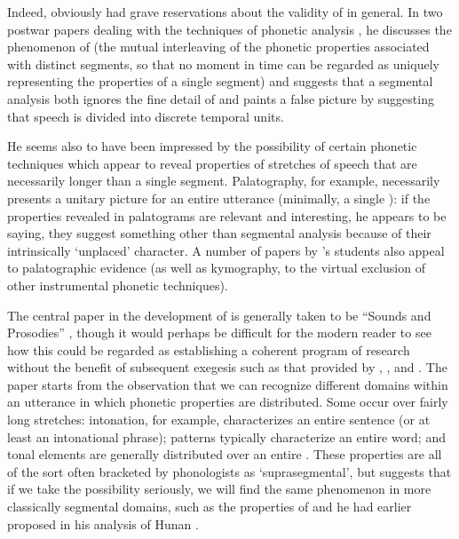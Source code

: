 Indeed, {\Firth} obviously had grave reservations about the validity of
 in general. In two postwar papers dealing with the
techniques of phonetic analysis
\citep{firth48:palatograms,firth50:palatography}, he discusses the
phenomenon of  (the mutual interleaving of the phonetic
properties associated with distinct segments, so that no moment in
time can be regarded as uniquely representing the properties of a
single segment) and suggests that a segmental analysis both ignores
the fine detail of  and paints a false picture by
suggesting that speech is divided into discrete temporal units.

He seems also to have been impressed by the possibility of certain
phonetic techniques which appear to reveal properties of stretches of
speech that are necessarily longer than a single
segment. Palatography, for example, necessarily presents a unitary
picture for an entire utterance (minimally, a single ): if the
properties revealed in palatograms are relevant and interesting, he
appears to be saying, they suggest something other than segmental
analysis because of their intrinsically `unplaced' character. A number
of papers by {\Firth}'s students also appeal to palatographic evidence
(as well as kymography, to the virtual exclusion of other instrumental
phonetic techniques).

The central paper in the development of  is generally
taken to be ``Sounds and Prosodies'' \citep{firth48:sounds:prosodies},
though it would perhaps be difficult for the modern reader to see how
this could be regarded as establishing a coherent program of research
without the benefit of subsequent exegesis such as that provided by
\citet{robins:prosodic,robins:ling_in_gb},
\citet{lyons62:non-phonemic}, and \citet{palmer70:prosodic}. The paper
starts from the observation that we can recognize different domains
within an utterance in which phonetic properties are distributed. Some
occur over fairly long stretches: intonation, for example,
characterizes an entire sentence (or at least an intonational phrase);
 patterns typically characterize an entire word; and tonal
elements are generally distributed over an entire . These
properties are all of the sort often bracketed by phonologists as
`suprasegmental', but {\Firth} suggests that if we take the possibility
seriously, we will find the same phenomenon in more classically
segmental domains, such as the properties of  and
 he had earlier proposed in his analysis of Hunan
.

